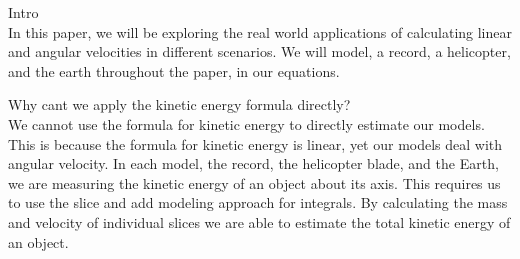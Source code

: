 \documentclass[a4paper, 11pt, oneside]{book} %
\begin{document}
\pagebreak{}
\centering %
{\LARGE Intro\\} %
\vspace{0.5\baselineskip} %
In this paper, we will be exploring the real world applications of calculating linear and angular velocities in different scenarios. We will model, a record, a helicopter, and the earth throughout the paper, in our equations.
\vspace{1.0\baselineskip} %

{\LARGE Why cant we apply the kinetic energy formula directly? \\} %
\vspace{0.5\baselineskip} %
We cannot use the formula for kinetic energy to directly estimate our models. This is because the formula for kinetic energy is linear, yet our models deal with angular velocity. In each model, the record, the helicopter blade, and the Earth, we are measuring the kinetic energy of an object about its axis. This requires us to use the slice and add modeling approach for integrals. By calculating the mass and velocity of individual slices we are able to estimate the total kinetic energy of an object.

\vspace{1.0\baselineskip} %
\end{document}
